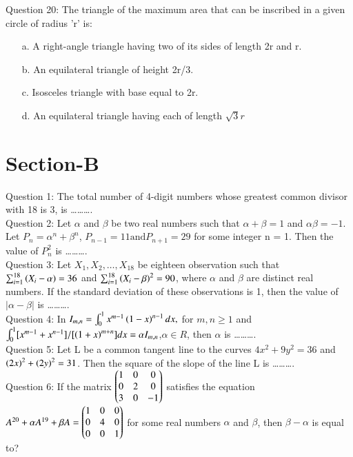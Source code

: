 \documentclass[journal,12pt,twocolumn]{IEEEtran}
\theoremstyle{remark}
\begin{document}
Question 20: The triangle of the maximum area that can be inscribed in a given circle of radius 'r' is:
\begin{enumerate}
    \item [a.] A right-angle triangle having two of its sides of length 2r and r.
    \item [b.] An equilateral triangle of height 2r/3.
    \item [c.] Isosceles triangle with base equal to 2r.
    \item [d.] An equilateral triangle having each of length $\sqrt{3}r$
\end{enumerate}
\section{Section-B}
Question 1: The total number of 4-digit numbers whose greatest common divisor with 18 is 3, is \ldots\ldots\ldots.\vspace{0.5mm}\\
Question 2: Let $\alpha$ and $\beta$ be two real numbers such that $\alpha + \beta = 1$ and $\alpha\beta = -1$. Let $P_n = \alpha^n + \beta^n$, $P_{n-1} = 11 \text{and} P_{n+1} = 29$ for some integer n = 1. Then the value of $P_n ^2$ is \ldots\ldots\ldots.\vspace{0.5mm}\\
Question 3: Let $X_1,X_2,\ldots,X_{18}$ be eighteen observation such that $\sum_{i=1} ^{18} \left(X_i - \alpha\right) = 36$ and $\sum_{i=1} ^{18} \left(X_i - \beta\right)^2 = 90$, where $\alpha$ and $\beta$ are distinct real numbers. If the standard deviation of these observations is 1, then the value of $|\alpha - \beta|$ is \ldots\ldots\ldots.\vspace{0.5mm} \\ 
Question 4: In $I_{m,n} = \int _0 ^1 x^{m-1}\left(1-x\right)^{n-1}dx,$ for $m,n\geq1$ and $\int _0 ^1[x^{m-1} + x^{n-1}]/[\left(1+x\right)^{m+n}]dx = \alpha I_{m,n}$,$\alpha \in R$, then $\alpha$ is \ldots\ldots\ldots. \vspace{0.5mm}\\
Question 5: Let L be a common tangent line to the curves $4x^2 + 9y^2 = 36$ and $\left(2x\right)^2 + \left(2y\right)^2=31$. Then the square of the slope of the line L is \ldots\ldots\ldots.\vspace{0.5mm}\\
Question 6: If the matrix $\begin{pmatrix}1&0&0\\0&2&0\\3&0&-1\end{pmatrix}$
satisfies the equation $A^{20} + \alpha A^{19} + \beta A = \begin{pmatrix}1&0&0\\0&4&0\\0&0&1\end{pmatrix}$ for some real numbers $\alpha$ and $\beta$, then $\beta - \alpha$ is equal to?\vspace{0.5mm}\\
\end{document}
